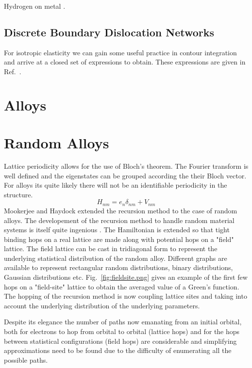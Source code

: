 Hydrogen on metal \cite{garciavidal91}.

\subsection{Discrete Boundary Dislocation Networks}
For isotropic elasticity we can gain some useful practice in contour integration and arrive
at a closed set of expressions to obtain. These expressions are given in Ref.~\cite{sutton95}.

\section{Alloys}
\cite{glaser81}
\section{Random Alloys}
Lattice periodicity allows for the use of Bloch's theorem. The Fourier transform
is well defined and the eigenstates can be grouped according the their Bloch vector.
For alloys its quite likely there will not be an identifiable periodicity in 
the structure.
%
\begin{equation}
H_{nm} = e_{n}\delta_{nm} + V_{nm}
\end{equation}
%
Mookerjee and Haydock extended the recursion method to the case of random alloys.
The developement of the recursion method to handle random material systems is 
itself quite ingenious \cite{mookerjee, haydock74}. The Hamiltonian is extended
so that tight binding hops on a real lattice are made along with potential hops
on a "field" lattice. The field lattice can be cast in tridiagonal form to represent
the underlying statistical distribution of the random alloy. Different graphs are available
to represent rectangular random distributions, binary distributions, Gaussian distributions
etc. Fig.~\ref{fig:fieldsite.png} gives an example of the first few hops on a "field-site" 
lattice to obtain the averaged value of a Green's function. The hopping of the recursion method
is now coupling lattice sites and taking into account the underlying distribution of 
the underlying parameters.

Despite its elegance the number of paths now emanating from an initial orbital, both
for electrons to hop from orbital to orbital (lattice hops) and for the hops between 
statistical configurations (field hops) are considerable and simplifying approximations 
need to be found due to the difficulty of enumerating all the possible paths.

